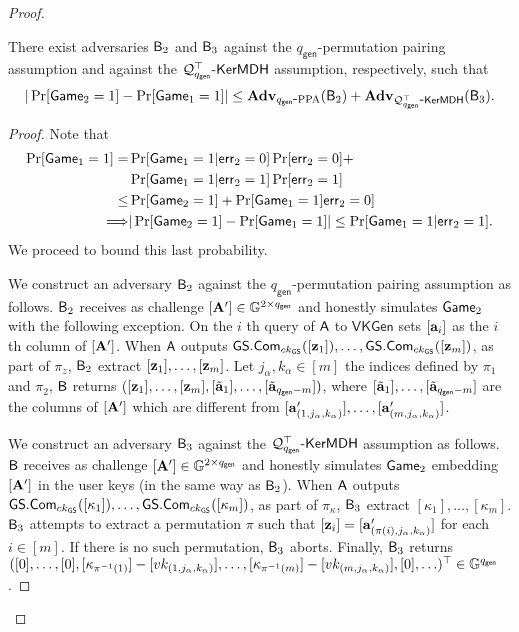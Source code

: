 \begin{proof}
\begin{lemma} There exist adversaries $\mathsf{B}_2$ and $\mathsf{B}_3$ against the ${q_\mathsf{gen}}$-permutation pairing assumption and against the $\mathcal{Q}^\top_{{q_\mathsf{gen}}}\mbox{-}\mathsf{KerMDH}$ assumption, respectively, such that
$$
|\Pr[\mathsf{Game}_2=1]-\Pr[\mathsf{Game}_1=1]|\leq \mathbf{Adv}_{{q_\mathsf{gen}}\mbox{-}\mathrm{PPA}}(\mathsf{B}_2)+\mathbf{Adv}_{\mathcal{Q}^\top_{{q_\mathsf{gen}}}\mbox{-}\mathsf{KerMDH}}(\mathsf{B}_3).
$$
\end{lemma}
\begin{proof}
Note that
\begin{align*}
\Pr[\mathsf{Game}_1=1]
 = &\Pr[\mathsf{Game}_1=1|\mathsf{err}_2=0]\Pr[\mathsf{err}_2=0]+\\
&\Pr[\mathsf{Game}_1=1|\mathsf{err}_2=1]\Pr[\mathsf{err}_2=1]\\
 \leq& \Pr[\mathsf{Game}_2=1] + \Pr[\mathsf{Game}_1=1]\mathsf{err}_2=0]\\
\Longrightarrow & |\Pr[\mathsf{Game}_2=1]-\Pr[\mathsf{Game}_1=1]|\leq \Pr[\mathsf{Game}_1=1|\mathsf{err}_2=1].
\end{align*}
We proceed to bound this last probability.

We construct an adversary $\mathsf{B}_2$ against the ${q_\mathsf{gen}}$-permutation pairing assumption as follows. $\mathsf{B}_2$ receives as challenge $[\mathbf{{A}}']\in\mathbb{G}^{2\times {q_\mathsf{gen}}}$ and honestly simulates $\mathsf{Game}_2$ with the following exception. On the $i$ th query of $\mathsf{A}$ to $\mathsf{VKGen}$ sets $[\mathbf{a}_i]$ as the $i$ th column of $[\mathbf{{A}}']$. When $\mathsf{A}$ outputs ${\mathsf{GS}}.\mathsf{Com}_{ck_{\mathsf{GS}}}([\mathbf{z}_1]),\ldots,\allowbreak{\mathsf{GS}}.\mathsf{Com}_{ck_{\mathsf{GS}}}([\mathbf{z}_m])$, as part of $\pi_z$, $\mathsf{B}_2$ extract $[\mathbf{z}_1],\ldots,[\mathbf{z}_m]$.  Let $j_\alpha,k_\alpha\in[m]$ the indices defined by $\pi_1$ and $\pi_2$, $\mathsf{B}$ returns $([\mathbf{z}_1],\ldots,[\mathbf{z}_m],[\tilde{\mathbf{a}}_1],\ldots,[\tilde{\mathbf{a}}_{{q_\mathsf{gen}}-m}])$, where $[\tilde{\mathbf{a}}_1],\ldots,[\tilde{\mathbf{a}}_{{q_\mathsf{gen}}-m}]$ are the columns of $[\mathbf{{A}}']$ which are different from $[\mathbf{a}'_{(1,j_\alpha,k_\alpha)}],\ldots,\allowbreak[\mathbf{a}'_{(m,j_\alpha,k_\alpha)}]$.

We construct an adversary $\mathsf{B}_3$ against the $\mathcal{Q}_{q_\mathsf{gen}}^\top\mbox{-}\mathsf{KerMDH}$ assumption as follows. $\mathsf{B}$ receives as challenge $[\mathbf{{A}}']\in\mathbb{G}^{2\times {q_\mathsf{gen}}}$ and honestly simulates $\mathsf{Game}_2$ embedding $[\mathbf{{A}}']$ in the user keys (in the same way as $\mathsf{B}_2$). When $\mathsf{A}$ outputs ${\mathsf{GS}}.\mathsf{Com}_{ck_{\mathsf{GS}}}([\kappa_1]),\ldots,\allowbreak{\mathsf{GS}}.\mathsf{Com}_{ck_{\mathsf{GS}}}([\kappa_m])$, as part of $\pi_\kappa$, $\mathsf{B}_3$ extract $[\kappa_1],\ldots,[\kappa_m]$. $\mathsf{B}_3$ attempts to extract a permutation $\pi$ such that  $[\mathbf{z}_i]=[\mathbf{a}'_{(\pi(i),j_\alpha,k_\alpha)}]$ for each $i\in[m]$. If there is no such permutation, $\mathsf{B}_3$ aborts. Finally, $\mathsf{B}_3$ returns $([0],\ldots,[0],[\kappa_{\pi^{-1}(1)}]-[vk_{(1,j_\alpha,k_\alpha)}],\ldots,[\kappa_{\pi^{-1}(m)}]-[vk_{(m,j_\alpha,k_\alpha)}],[0],\ldots)^\top\in\mathbb{G}^{{q_\mathsf{gen}}}$.


\end{proof}
\end{proof}
